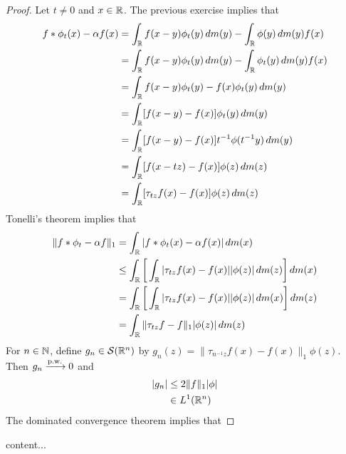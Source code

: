 \documentclass{book}
\begin{document}
	\begin{proof}
		Let $t \neq 0$ and $x \in \mathbb{R}$. The previous exercise implies that 
		\begin{align*}
			f * \phi_t(x) - \alpha f(x) 
			& = \int_{\mathbb{R}} f(x-y) \phi_t(y) \, d m(y) - \int_{\mathbb{R}} \phi(y) \, d m(y) f(x) \\
			& = \int_{\mathbb{R}} f(x-y) \phi_t(y) \, d m(y) - \int_{\mathbb{R}} \phi_t(y) \, d m(y) f(x) \\
			& = \int_{\mathbb{R}} f(x-y) \phi_t(y)  -  f(x) \phi_t(y) \, d m(y) \\
			& = \int_{\mathbb{R}} [f(x-y)  -  f(x)] \phi_t(y) \, d m(y) \\
			& = \int_{\mathbb{R}} [f(x-y)  -  f(x)] t^{-1}\phi(t^{-1}y) \, d m(y) \\
			& = \int_{\mathbb{R}} [f(x-tz)  -  f(x)] \phi(z) \, d m(z) \\
			& = \int_{\mathbb{R}} [\tau_{tz}f(x) -  f(x)] \phi(z) \, d m(z)   
		\end{align*}
		Tonelli's theorem implies that 
		\begin{align*}
			\|f * \phi_t - \alpha f \|_1
			& = \int_{\mathbb{R}}|f * \phi_t(x) - \alpha f(x) | \, d m(x) \\
			& \leq \int_{\mathbb{R}} \bigg[ \int_{\mathbb{R}} |\tau_{tz}f(x)  -  f(x)| |\phi(z)| \, d m(z) \bigg] \, d m(x) \\
			& =  \int_{\mathbb{R}} \bigg[ \int_{\mathbb{R}} |\tau_{tz}f(x)  -  f(x)| |\phi(z)| \, d m(x) \bigg] \, d m(z) \\
			& = \int_{\mathbb{R}} \|\tau_{tz}f - f\|_1|\phi(z)| \, d m(z)
		\end{align*}
		For $n \in \mathbb{N}$, define $g_n \in \mathcal{S}(\mathbb{R}^n)$ by $g_n(z) = \|\tau_{n^{-1}z}f(x)  -  f(x)\|_1 \phi(z)$. Then $g_n \xrightarrow{\text{p.w.}} 0$ and 
		\begin{align*}
			|g_n| 
			& \leq 2\|f\|_1|\phi| \\
			& \in L^1(\mathbb{R}^n)
		\end{align*} 
		The dominated convergence theorem implies that 
		
	\end{proof}

	
	


	\begin{defn}
		content...
	\end{defn}
	
	
	
	
	
	
	
	
	
	
	
	
	
	
	
\end{document}

